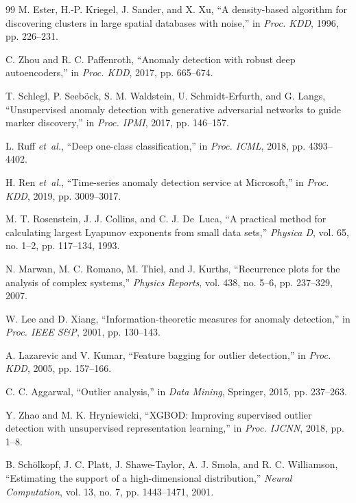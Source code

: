 \documentclass[journal]{IEEEtran}
\newcommand{\etal}{\textit{et~al.}}
\begin{document}
\begin{thebibliography}{99}
M. Ester, H.-P. Kriegel, J. Sander, and X. Xu, ``A density-based algorithm for discovering clusters in large spatial databases with noise,'' in \textit{Proc. KDD}, 1996, pp. 226--231.

C. Zhou and R. C. Paffenroth, ``Anomaly detection with robust deep autoencoders,'' in \textit{Proc. KDD}, 2017, pp. 665--674.

T. Schlegl, P. Seeb{\"o}ck, S. M. Waldstein, U. Schmidt-Erfurth, and G. Langs, ``Unsupervised anomaly detection with generative adversarial networks to guide marker discovery,'' in \textit{Proc. IPMI}, 2017, pp. 146--157.

L. Ruff \etal, ``Deep one-class classification,'' in \textit{Proc. ICML}, 2018, pp. 4393--4402.

H. Ren \etal, ``Time-series anomaly detection service at Microsoft,'' in \textit{Proc. KDD}, 2019, pp. 3009--3017.

M. T. Rosenstein, J. J. Collins, and C. J. De~Luca, ``A practical method for calculating largest Lyapunov exponents from small data sets,'' \textit{Physica D}, vol. 65, no. 1--2, pp. 117--134, 1993.

N. Marwan, M. C. Romano, M. Thiel, and J. Kurths, ``Recurrence plots for the analysis of complex systems,'' \textit{Physics Reports}, vol. 438, no. 5--6, pp. 237--329, 2007.

W. Lee and D. Xiang, ``Information-theoretic measures for anomaly detection,'' in \textit{Proc. IEEE S\&P}, 2001, pp. 130--143.

A. Lazarevic and V. Kumar, ``Feature bagging for outlier detection,'' in \textit{Proc. KDD}, 2005, pp. 157--166.

C. C. Aggarwal, ``Outlier analysis,'' in \textit{Data Mining}, Springer, 2015, pp. 237--263.

Y. Zhao and M. K. Hryniewicki, ``XGBOD: Improving supervised outlier detection with unsupervised representation learning,'' in \textit{Proc. IJCNN}, 2018, pp. 1--8.

B. Sch{\"o}lkopf, J. C. Platt, J. Shawe-Taylor, A. J. Smola, and R. C. Williamson, ``Estimating the support of a high-dimensional distribution,'' \textit{Neural Computation}, vol. 13, no. 7, pp. 1443--1471, 2001.


\end{thebibliography}
\end{document}

